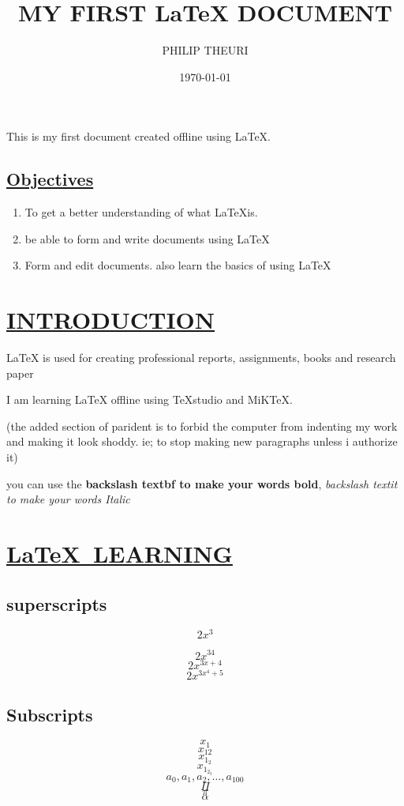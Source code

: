 \documentclass{article}
\title{MY FIRST \LaTeX{} DOCUMENT}
\author{PHILIP THEURI}
\date{\today}
\begin{document}
	
	\maketitle
	
	This is my first document created offline using \LaTeX{}.
	
	\subsection{\underline{Objectives}}
	\begin{enumerate}
	 \item To get a better understanding of what \LaTeX is.
	\item be able to form and write documents using \LaTeX
	\item Form and edit documents. also learn the basics of using \LaTeX
	\end{enumerate}
	\section{\underline{INTRODUCTION}}
	
	\LaTeX{} is used for creating professional reports, assignments, books and research paper
	
	I am learning \LaTeX{} offline using TeXstudio and MiKTeX.
	
	
	(the added section of parident is to forbid the computer from indenting my work and making it look shoddy. ie; to stop making new paragraphs unless i authorize it)
	
	you can use the \textbf{backslash textbf to make your words bold}, \textit{backslash textit to make your words Italic}
	\section{\underline{\LaTeX\ LEARNING}}
	
	
	\subsection{superscripts}
	$$2x^3$$
	
	$$2x^{34}$$
	$$2x^{3x+4}$$
	$$2x^{3x^4+5}$$
	
	\subsection{Subscripts}
	
	$$x_1$$
	$$x_{12}$$
	$$x_{1_2}$$
	$$x_{1_{2_3}}$$
	$$a_0,a_1,a_2,\ldots,a_{100}$$
	$$\Pi$$
	$$\pi$$
	$$\alpha$$
	
\end{document}
